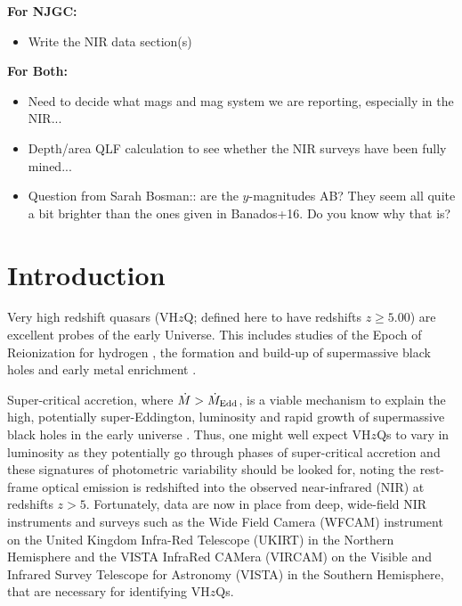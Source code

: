 \documentclass[usenatbib]{mnras}
\begin{document}
\noindent
{\bf For NJGC: }
\begin{itemize}
\item Write the NIR data section(s) 
\end{itemize}

\noindent
{\bf For Both: }
\begin{itemize}
\item Need to decide what mags and mag system we are reporting, especially in the 
NIR...
\item Depth/area QLF calculation to see whether the NIR surveys have been fully mined...
\item Question from Sarah Bosman:: are the $y$-magnitudes AB? They seem all quite a bit brighter than the ones given in Banados+16. Do you know why that is?
\end{itemize}
\fi


\section{Introduction}
Very high redshift quasars (VH$z$Q; defined here to have redshifts
$z\geq5.00$) are excellent probes of the early Universe. This includes
studies of the Epoch of Reionization for hydrogen \citep[see e.g.][for
reviews]{Fan2006review, Mortlock2016}, the formation and build-up of
supermassive black holes \citep[e.g., ][]{Rees1984, WyitheLoeb2003,
Volonteri2010, Agarwal2016, Valiante2018, Latif2018} and early metal
enrichment \citep[see e.g., ][]{Simcoe2012, Chen2017, Bosman2017}.

Super-critical accretion, where $\dot{M} > \dot{M}_{\rm Edd}$, is a
viable mechanism to explain the high, potentially super-Eddington,
luminosity and rapid growth of supermassive black holes in the early
universe \citep[e.g.,][]{AlexanderNatarajan2014, MadauHaardtDotti2014,
Volonteri2015, Pezzulli2016, Lupi2016, Pezzulli2017, Takeo2018}. Thus,
one might well expect VH$z$Qs to vary in luminosity as they
potentially go through phases of super-critical accretion and these
signatures of photometric variability should be looked for, noting the
rest-frame optical emission is redshifted into the observed
near-infrared (NIR) at redshifts $z>5$. Fortunately, data are now in
place from deep, wide-field NIR instruments and surveys such as the
Wide Field Camera (WFCAM) instrument on the United Kingdom Infra-Red
Telescope (UKIRT) in the Northern Hemisphere and the VISTA InfraRed
CAMera (VIRCAM) on the Visible and Infrared Survey Telescope for
Astronomy (VISTA) in the Southern Hemisphere, that are necessary for
identifying VH$z$Qs.
\end{document}
